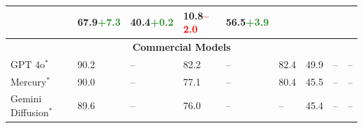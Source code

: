 \begin{table}[t]
\begin{tabular}{@{} l ll ll l ll l @{}}
        & 67.9{\tiny\textcolor{ForestGreen}{+7.3}}  
        & 40.4{\tiny\textcolor{ForestGreen}{+0.2}}  
        & 10.8{\tiny\textcolor{red}{–2.0}}  
        & 56.5{\tiny\textcolor{ForestGreen}{+3.9}} \\
        \midrule
        \multicolumn{9}{c}{\textbf{Commercial Models}} \\
        \midrule
        \cellcolor{lightRed!12}GPT 4o$^*$             & 90.2  & –     & 82.2  & –     & 82.4  & 49.9  & –   & – \\
        \cellcolor{lightYellow!12}Mercury$^*$             & 90.0    & –     & 77.1  & –     & 80.4  & 45.5  & –   &–  \\
        \cellcolor{lightYellow!12}Gemini Diffusion$^*$            & 89.6    & –     & 76.0  & –     & –  & 45.4  & –   & – \\
        \bottomrule
    \end{tabular}
    \label{tab:maintab}
\end{table}
